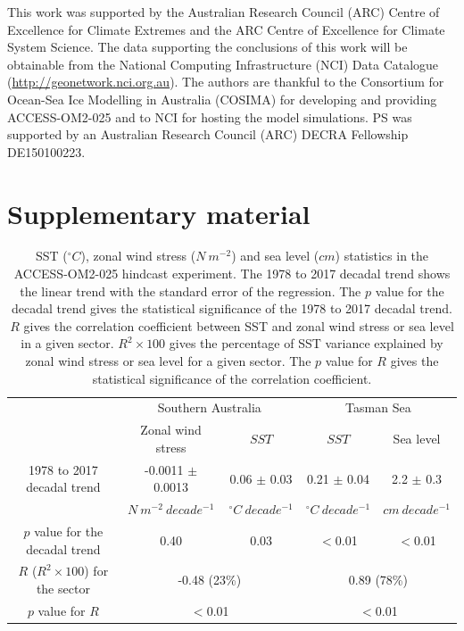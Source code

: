 \documentclass[draft,linenumbers]{agujournal2018}
\begin{document}
\acknowledgments
This work was supported by the Australian Research Council (ARC) Centre of Excellence for Climate Extremes and the ARC Centre of Excellence for Climate System Science. The data supporting the conclusions of this work will be obtainable from the National Computing Infrastructure (NCI) Data Catalogue (\url{http://geonetwork.nci.org.au}). The authors are thankful to the Consortium for Ocean-Sea Ice Modelling in Australia (COSIMA) for developing and providing ACCESS-OM2-025 and to NCI for hosting the model simulations. PS was supported by an Australian Research Council (ARC) DECRA Fellowship DE150100223.
 


\appendix
\section{Supplementary material}
\begin{table}
\caption{SST ($^{\circ}C$), zonal wind stress ($N\ m^{-2}$) and sea level ($cm$) statistics in the ACCESS-OM2-025 hindcast experiment. The 1978 to 2017 decadal trend shows the linear trend with the standard error of the regression. The $p$ value for the decadal trend gives the statistical significance of the 1978 to 2017 decadal trend. $R$ gives the correlation coefficient between SST and zonal wind stress or sea level in a given sector. $R^2 \times 100$ gives the percentage of SST variance explained by zonal wind stress or sea level for a given sector. The $p$ value for $R$ gives the statistical significance of the correlation coefficient.}
\centering
\begin{tabular}{c c c c c}
\hline
  & \multicolumn{2}{c}{Southern Australia} & \multicolumn{2}{c}{Tasman Sea} \\
  & Zonal wind stress  & $SST$ & $SST$ & Sea level\\
\hline
  1978 to 2017 decadal trend & -0.0011 $\pm$ 0.0013 & 0.06 $\pm$ 0.03 & 0.21 $\pm$ 0.04 & 2.2 $\pm$ 0.3 \\
  & $N\ m^{-2}\ decade^{-1}$ & $^{\circ}C\ decade^{-1}$ & $^{\circ}C\ decade^{-1}$ & $cm\ decade^{-1}$ \\
  $p$ value for the decadal trend & 0.40 & 0.03 & $<$0.01 & $<$0.01 \\
  $R$ ($R^2 \times 100$) for the sector & \multicolumn{2}{c}{-0.48 (23\%)} & \multicolumn{2}{c}{0.89 (78\%)} \\
  $p$ value for $R$ & \multicolumn{2}{c}{$<$0.01} & \multicolumn{2}{c}{$<$0.01} \\
\hline
\end{tabular}
\label{Table3}
\end{table}
\end{document}
